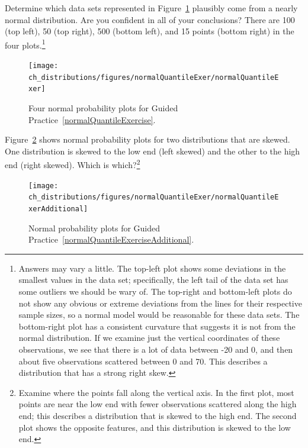 \begin{exercise}\label{normalQuantileExercise}
Determine which data sets represented in Figure~\ref{normalQuantileExer} plausibly come from a nearly normal distribution. Are you confident in all of your conclusions? There are 100 (top left), 50 (top right), 500 (bottom left), and 15 points (bottom right) in the four plots.\footnote{Answers may vary a little. The top-left plot shows some deviations in the smallest values in the data set; specifically, the left tail of the data set has some outliers we should be wary of. The top-right and bottom-left plots do not show any obvious or extreme deviations from the lines for their respective sample sizes, so a normal model would be reasonable for these data sets. The bottom-right plot has a consistent curvature that suggests it is not from the normal distribution. If we examine just the vertical coordinates of these observations, we see that there is a lot of data between -20 and 0, and then about five observations scattered between 0 and 70. This describes a distribution that has a strong right skew.}
\end{exercise}

\begin{figure}
\centering
\texttt{[image: ch\_distributions/figures/normalQuantileExer/normalQuantileExer]}
\caption{Four normal probability plots for Guided Practice~\ref{normalQuantileExercise}.}
\label{normalQuantileExer}
\end{figure}

\begin{exercise} \label{normalQuantileExerciseAdditional}
Figure~\ref{normalQuantileExerAdditional} shows normal probability plots for two distributions that are skewed. One distribution is skewed to the low end (left skewed) and the other to the high end (right skewed). Which is which?\footnote{Examine where the points fall along the vertical axis. In the first plot, most points are near the low end with fewer observations scattered along the high end; this describes a distribution that is skewed to the high end. The second plot shows the opposite features, and this distribution is skewed to the low end.}
\end{exercise}

\begin{figure}
\centering
\texttt{[image: ch\_distributions/figures/normalQuantileExer/normalQuantileExerAdditional]}
\caption{Normal probability plots for Guided Practice~\ref{normalQuantileExerciseAdditional}.}
\label{normalQuantileExerAdditional}
\end{figure}


